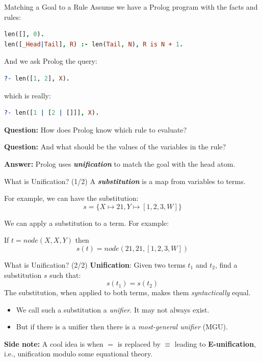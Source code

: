 \begin{frame}[fragile]{Matching a Goal to a Rule}
Assume we have a Prolog program with the facts and rules:

\begin{lstlisting}[language=prolog, xleftmargin=0.5cm]
len([], 0).
len([_Head|Tail], R) :- len(Tail, N), R is N + 1.
\end{lstlisting}

\pause 

And we ask Prolog the query:

\begin{lstlisting}[language=prolog, xleftmargin=0.5cm]
?- len([1, 2], X).
\end{lstlisting}

which is really: 

\begin{lstlisting}[language=prolog, xleftmargin=0.5cm]
?- len([1 | [2 | []]], X).
\end{lstlisting}

\textbf{Question:} How does Prolog know which rule to evaluate?

\textbf{Question:} And what should be the values of the variables in the rule?

\pause 

\textbf{Answer:} Prolog uses \textbf{\emph{unification}} to match the goal with
the head atom.
\end{frame}   

\begin{frame}{What is Unification? (1/2)}
A \textbf{\emph{substitution}} is a map from variables to terms.

\pause

For example, we can have the substitution:
\[
    s = \{ X \mapsto 21, Y \mapsto [1, 2, 3, W] \} 
\]

\pause

We can apply a substitution to a term. For example: 

If $t = node(X, X, Y)$ then 
\[
    s(t) = node(21, 21, [1, 2, 3, W])
\]
\end{frame}  

\begin{frame}{What is Unification? (2/2)}
\textbf{Unification}: Given two terms $t_1$ and $t_2$, find a substitution $s$
such that:
%
\[
    s(t_1) = s(t_2)
\]
%
The substitution, when applied to both terms, makes them \emph{syntactically} equal. 
%
\begin{itemize}
    \item We call such a substitution a \emph{unifier}. It may not always exist.
    \item But if there is a unifier then there is a \emph{most-general unifier} (MGU).
\end{itemize}

\pause

\textbf{Side note:} A cool idea is when $=$ is replaced by $\equiv$ leading to
\textbf{E-unification}, i.e., unification modulo some equational theory. 
\end{frame}  

